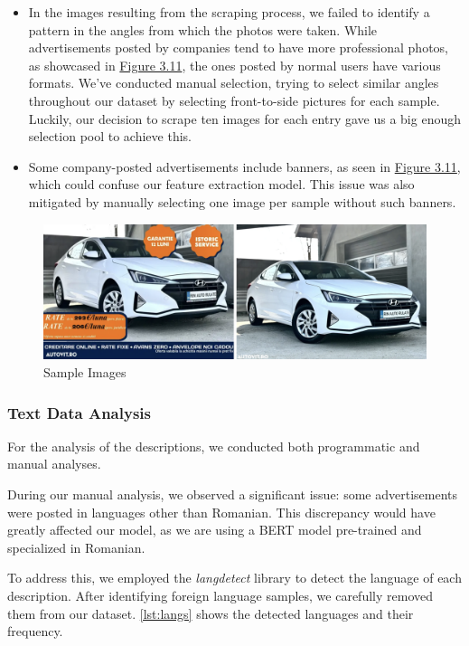 \begin{itemize}
    \item In the images resulting from the scraping process, we failed to identify a pattern in the angles from which the photos were taken. While advertisements posted by companies tend to have more professional photos, as showcased in \hyperref[fig:sample-images]{Figure 3.11}, the ones posted by normal users have various formats. We've conducted manual selection, trying to select similar angles throughout our dataset by selecting front-to-side pictures for each sample. Luckily, our decision to scrape ten images for each entry gave us a big enough selection pool to achieve this.
    \item Some company-posted advertisements include banners, as seen in \hyperref[fig:sample-images]{Figure 3.11}, which could confuse our feature extraction model. This issue was also mitigated by manually selecting one image per sample without such banners.
\end{itemize}

\begin{figure}[ht]
    \centering
    \includegraphics[width=1\linewidth]{images/priceprediction/data/Screenshot 2024-05-28 at 21.33.30.png}
    \caption{Sample Images}
    \label{fig:sample-images}
\end{figure}

\subsubsection{Text Data Analysis}

For the analysis of the descriptions, we conducted both programmatic and manual analyses.

During our manual analysis, we observed a significant issue: some advertisements were posted in languages other than Romanian. This discrepancy would have greatly affected our model, as we are using a BERT model pre-trained and specialized in Romanian.

To address this, we employed the \textit{langdetect} library \cite{langdetect} to detect the language of each description. After identifying foreign language samples, we carefully removed them from our dataset. \autoref{lst:langs} shows the detected languages and their frequency.

